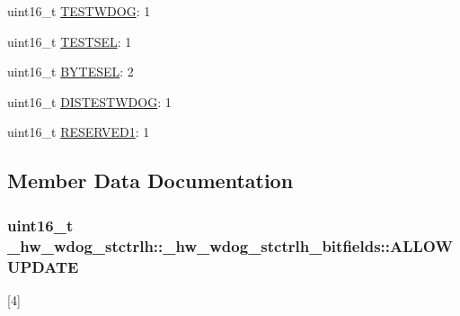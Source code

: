 \begin{DoxyCompactItemize}
uint16\+\_\+t \hyperlink{struct__hw__wdog__stctrlh_1_1__hw__wdog__stctrlh__bitfields_ad9dcb25321dbb5d350ba60ff69dede41}{T\+E\+S\+T\+W\+D\+OG}\+: 1
\item 
uint16\+\_\+t \hyperlink{struct__hw__wdog__stctrlh_1_1__hw__wdog__stctrlh__bitfields_a945684b06085fcea76c30e54464598af}{T\+E\+S\+T\+S\+EL}\+: 1
\item 
uint16\+\_\+t \hyperlink{struct__hw__wdog__stctrlh_1_1__hw__wdog__stctrlh__bitfields_a9faa6d62e76375456d45268615cc0dc9}{B\+Y\+T\+E\+S\+EL}\+: 2
\item 
uint16\+\_\+t \hyperlink{struct__hw__wdog__stctrlh_1_1__hw__wdog__stctrlh__bitfields_a46f115741df79911ad226a097b183bef}{D\+I\+S\+T\+E\+S\+T\+W\+D\+OG}\+: 1
\item 
uint16\+\_\+t \hyperlink{struct__hw__wdog__stctrlh_1_1__hw__wdog__stctrlh__bitfields_a42a95f1a36ec0588d7b5c36976763022}{R\+E\+S\+E\+R\+V\+E\+D1}\+: 1
\end{DoxyCompactItemize}


\subsection{Member Data Documentation}
\subsubsection[{\texorpdfstring{A\+L\+L\+O\+W\+U\+P\+D\+A\+TE}{ALLOWUPDATE}}]{\setlength{\rightskip}{0pt plus 5cm}uint16\+\_\+t \+\_\+hw\+\_\+wdog\+\_\+stctrlh\+::\+\_\+hw\+\_\+wdog\+\_\+stctrlh\+\_\+bitfields\+::\+A\+L\+L\+O\+W\+U\+P\+D\+A\+TE}\hypertarget{struct__hw__wdog__stctrlh_1_1__hw__wdog__stctrlh__bitfields_a450540aa9c8b0d701c69cbb4c8e1f410}{}\label{struct__hw__wdog__stctrlh_1_1__hw__wdog__stctrlh__bitfields_a450540aa9c8b0d701c69cbb4c8e1f410}
\mbox{[}4\mbox{]} 
